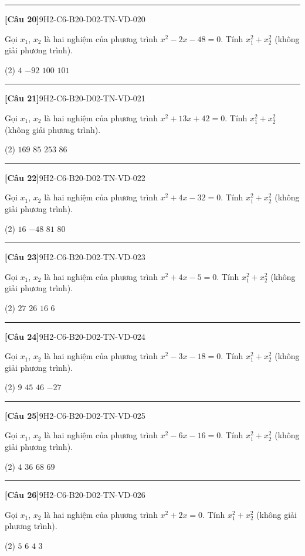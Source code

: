 \documentclass[12pt,a4paper]{article}
\newif\ifloigiai
\newenvironment{cauhoi}[2]{%
  \par\medskip\noindent\rule{\textwidth}{0.4pt}\par\nopagebreak
  \noindent\textbf{[#1]}\hfill{\scriptsize\ttfamily #2}\par\nopagebreak\smallskip}{\par}
\newcommand{\dapan}[1]{\ifloigiai\par\smallskip\noindent\textit{Đáp án:} \textbf{#1}\par\fi}
\begin{document}
\begin{cauhoi}{Câu 20}{9H2-C6-B20-D02-TN-VD-020}
Gọi $x_1$, $x_2$ là hai nghiệm của phương trình $x^{2}-2x-48=0$. Tính $x_1^{2}+x_2^{2}$ (không giải phương trình).
\begin{tasks}(2)
\task $4$
\task $-92$
\task $100$
\task $101$
\end{tasks}
\dapan{C}
\end{cauhoi}
\begin{cauhoi}{Câu 21}{9H2-C6-B20-D02-TN-VD-021}
Gọi $x_1$, $x_2$ là hai nghiệm của phương trình $x^{2}+13x+42=0$. Tính $x_1^{2}+x_2^{2}$ (không giải phương trình).
\begin{tasks}(2)
\task $169$
\task $85$
\task $253$
\task $86$
\end{tasks}
\dapan{B}
\end{cauhoi}
\begin{cauhoi}{Câu 22}{9H2-C6-B20-D02-TN-VD-022}
Gọi $x_1$, $x_2$ là hai nghiệm của phương trình $x^{2}+4x-32=0$. Tính $x_1^{2}+x_2^{2}$ (không giải phương trình).
\begin{tasks}(2)
\task $16$
\task $-48$
\task $81$
\task $80$
\end{tasks}
\dapan{D}
\end{cauhoi}
\begin{cauhoi}{Câu 23}{9H2-C6-B20-D02-TN-VD-023}
Gọi $x_1$, $x_2$ là hai nghiệm của phương trình $x^{2}+4x-5=0$. Tính $x_1^{2}+x_2^{2}$ (không giải phương trình).
\begin{tasks}(2)
\task $27$
\task $26$
\task $16$
\task $6$
\end{tasks}
\dapan{B}
\end{cauhoi}
\begin{cauhoi}{Câu 24}{9H2-C6-B20-D02-TN-VD-024}
Gọi $x_1$, $x_2$ là hai nghiệm của phương trình $x^{2}-3x-18=0$. Tính $x_1^{2}+x_2^{2}$ (không giải phương trình).
\begin{tasks}(2)
\task $9$
\task $45$
\task $46$
\task $-27$
\end{tasks}
\dapan{B}
\end{cauhoi}
\begin{cauhoi}{Câu 25}{9H2-C6-B20-D02-TN-VD-025}
Gọi $x_1$, $x_2$ là hai nghiệm của phương trình $x^{2}-6x-16=0$. Tính $x_1^{2}+x_2^{2}$ (không giải phương trình).
\begin{tasks}(2)
\task $4$
\task $36$
\task $68$
\task $69$
\end{tasks}
\dapan{C}
\end{cauhoi}
\begin{cauhoi}{Câu 26}{9H2-C6-B20-D02-TN-VD-026}
Gọi $x_1$, $x_2$ là hai nghiệm của phương trình $x^{2}+2x=0$. Tính $x_1^{2}+x_2^{2}$ (không giải phương trình).
\begin{tasks}(2)
\task $5$
\task $6$
\task $4$
\task $3$
\end{tasks}
\dapan{C}
\end{cauhoi}
\end{document}

